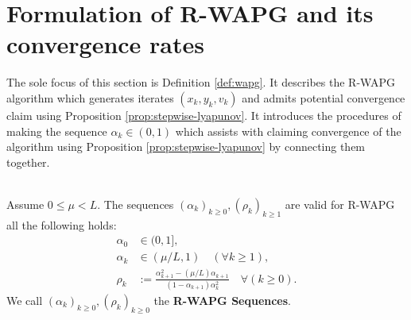 \documentclass[12pt]{article}
\begin{document}
\section{Formulation of R-WAPG and its convergence rates}
    The sole focus of this section is Definition \ref{def:wapg}.
    It describes the R-WAPG algorithm which generates iterates $(x_k, y_k, v_k)$ and admits potential convergence claim using Proposition \ref{prop:stepwise-lyapunov}. 
    It introduces the procedures of making the sequence $\alpha_k \in (0, 1)$ which assists with claiming convergence of the algorithm using Proposition \ref{prop:stepwise-lyapunov} by connecting them together. 
    \begin{definition}\label{def:rwapg-seq}\;\\
        Assume $0 \le \mu < L$. 
        The sequences $(\alpha_k)_{k \ge 0}, (\rho_k)_{k \ge1}$ are valid for R-WAPG all the following holds: 
        \begin{align*}
            \alpha_0 &\in (0, 1], 
            \\
            \alpha_k &\in (\mu/L, 1) \quad (\forall k \ge 1), 
            \\
            \rho_k &:= \frac{\alpha_{k + 1}^2 - (\mu/L)\alpha_{k + 1}}{(1 - \alpha_{k + 1})\alpha_k^2} \quad \forall (k \ge 0). 
        \end{align*}
        We call $(\alpha_k)_{k \ge 0}, (\rho_k)_{k \ge 0}$ the \textbf{R-WAPG Sequences}. 
    \end{definition}
\end{document}
